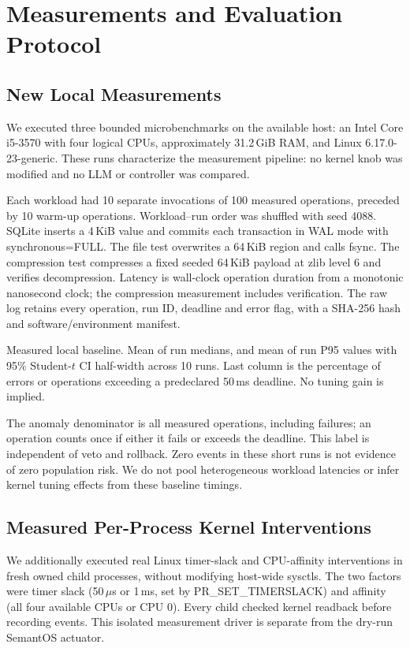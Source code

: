 \section{Measurements and Evaluation Protocol}
\label{sec:evaluation}
\subsection{New Local Measurements}
We executed three bounded microbenchmarks on the available host: an Intel Core i5-3570 with four logical CPUs, approximately 31.2\,GiB RAM, and Linux 6.17.0-23-generic. These runs characterize the measurement pipeline: no kernel knob was modified and no LLM or controller was compared.

Each workload had 10 separate invocations of 100 measured operations, preceded by 10 warm-up operations. Workload--run order was shuffled with seed 4088. SQLite inserts a 4\,KiB value and commits each transaction in WAL mode with synchronous=FULL. The file test overwrites a 64\,KiB region and calls fsync. The compression test compresses a fixed seeded 64\,KiB payload at zlib level 6 and verifies decompression. Latency is wall-clock operation duration from a monotonic nanosecond clock; the compression measurement includes verification. The raw log retains every operation, run ID, deadline and error flag, with a SHA-256 hash and software/environment manifest.

\begin{table}[t]
\centering
\caption{Measured local baseline. Mean of run medians, and mean of run P95 values with 95\% Student-$t$ CI half-width across 10 runs. Last column is the percentage of errors or operations exceeding a predeclared 50\,ms deadline. No tuning gain is implied.}
\label{tab:local}
\small
\begin{adjustbox}{max width=\columnwidth}

\end{adjustbox}
\end{table}

The anomaly denominator is all measured operations, including failures; an operation counts once if either it fails or exceeds the deadline. This label is independent of veto and rollback. Zero events in these short runs is not evidence of zero population risk. We do not pool heterogeneous workload latencies or infer kernel tuning effects from these baseline timings.

\subsection{Measured Per-Process Kernel Interventions}
We additionally executed real Linux timer-slack and CPU-affinity interventions in fresh owned child processes, without modifying host-wide sysctls. The two factors were timer slack (50\,$\mu$s or 1\,ms, set by PR\_SET\_TIMERSLACK) and affinity (all four available CPUs or CPU 0). Every child checked kernel readback before recording events. This isolated measurement driver is separate from the dry-run SemantOS actuator.

